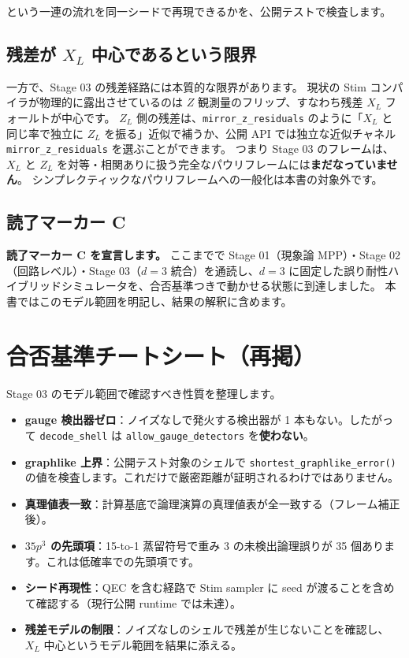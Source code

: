 という一連の流れを同一シードで再現できるかを、公開テストで検査します。

\subsection{残差が $X_L$ 中心であるという限界}

一方で、Stage 03 の残差経路には本質的な限界があります。
現状の Stim コンパイラが物理的に露出させているのは $Z$ 観測量のフリップ、すなわち残差 $X_L$ フォールトが中心です。
$Z_L$ 側の残差は、\texttt{mirror\_z\_residuals} のように「$X_L$ と同じ率で独立に $Z_L$ を振る」近似で補うか、公開 API では独立な近似チャネル \texttt{mirror\_z\_residuals} を選ぶことができます。
つまり Stage 03 のフレームは、$X_L$ と $Z_L$ を対等・相関ありに扱う完全なパウリフレームには\textbf{まだなっていません}。
シンプレクティックなパウリフレームへの一般化は本書の対象外です。

\subsection{読了マーカー C}

\begin{notebox}
  \textbf{読了マーカー C を宣言します。}
  ここまでで Stage 01（現象論 MPP）・Stage 02（回路レベル）・Stage 03（$d=3$ 統合）を通読し、$d=3$ に固定した誤り耐性ハイブリッドシミュレータを、合否基準つきで動かせる状態に到達しました。
  本書ではこのモデル範囲を明記し、結果の解釈に含めます。
\end{notebox}

\section{合否基準チートシート（再掲）}\label{sec:cheatsheet_c}

Stage 03 のモデル範囲で確認すべき性質を整理します。

\begin{itemize}
  \item \textbf{gauge 検出器ゼロ}：ノイズなしで発火する検出器が 1 本もない。したがって \texttt{decode\_shell} は \texttt{allow\_gauge\_detectors} を\textbf{使わない}。
  \item \textbf{graphlike 上界}：公開テスト対象のシェルで \texttt{shortest\_graphlike\_error()} の値を検査します。これだけで厳密距離が証明されるわけではありません。
  \item \textbf{真理値表一致}：計算基底で論理演算の真理値表が全一致する（フレーム補正後）。
  \item \textbf{$35p^3$ の先頭項}：15-to-1 蒸留符号で重み 3 の未検出論理誤りが 35 個あります。これは低確率での先頭項です。
  \item \textbf{シード再現性}：QEC を含む経路で Stim sampler に seed が渡ることを含めて確認する（現行公開 runtime では未達）。
  \item \textbf{残差モデルの制限}：ノイズなしのシェルで残差が生じないことを確認し、$X_L$ 中心というモデル範囲を結果に添える。
\end{itemize}

